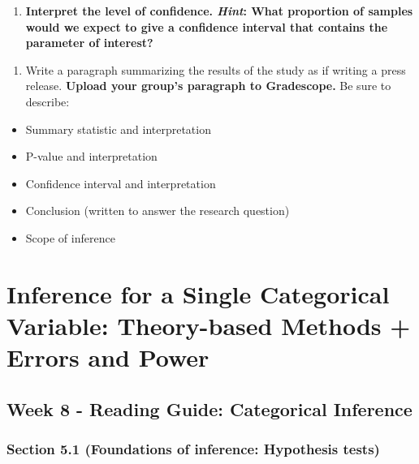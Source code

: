 \documentclass[
]{report}
\providecommand{\tightlist}{%
  \setlength{\itemsep}{0pt}\setlength{\parskip}{0pt}}
\begin{document}
\vspace{0.5in}

\begin{enumerate}
\def\labelenumi{\arabic{enumi}.}
\setcounter{enumi}{15}
\tightlist
\item
  \textbf{Interpret the level of confidence. \emph{Hint}: What proportion of samples would we expect to give a confidence interval that contains the parameter of interest?}
\end{enumerate}

\vspace{0.8in}

\begin{enumerate}
\def\labelenumi{\arabic{enumi}.}
\setcounter{enumi}{16}
\tightlist
\item
  Write a paragraph summarizing the results of the study as if writing a press release. \textbf{Upload your group's paragraph to Gradescope.} Be sure to describe:
\end{enumerate}

\begin{itemize}
\item
  Summary statistic and interpretation
\item
  P-value and interpretation
\item
  Confidence interval and interpretation
\item
  Conclusion (written to answer the research question)
\item
  Scope of inference
\end{itemize}

\newpage

\hypertarget{inference-for-a-single-categorical-variable-theory-based-methods-errors-and-power}{%
\chapter{Inference for a Single Categorical Variable: Theory-based Methods + Errors and Power}\label{inference-for-a-single-categorical-variable-theory-based-methods-errors-and-power}}

\hypertarget{week-8---reading-guide-categorical-inference}{%
\section{Week 8 - Reading Guide: Categorical Inference}\label{week-8---reading-guide-categorical-inference}}

\hypertarget{section-5.1-foundations-of-inference-hypothesis-tests-1}{%
\subsection*{Section 5.1 (Foundations of inference: Hypothesis tests)}\label{section-5.1-foundations-of-inference-hypothesis-tests-1}}
\end{document}

